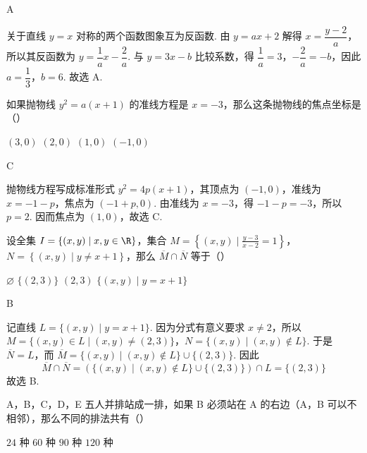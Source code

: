 \begin{answer}A\end{answer}

\begin{solution}
关于直线 \(y=x\) 对称的两个函数图象互为反函数. 由 \(y=ax+2\) 解得 \(x=\dfrac{y-2}{a}\)，所以其反函数为 \(y=\dfrac{1}{a}x-\dfrac{2}{a}\). 与 \(y=3x-b\) 比较系数，得 \(\dfrac1a=3\)，\(-\dfrac2a=-b\)，因此 \(a=\dfrac13\)，\(b=6\). 故选 A.
\end{solution}


\begin{problem}
如果抛物线 \(y^2=a(x+1)\) 的准线方程是 \(x=-3\)，那么这条抛物线的焦点坐标是（\quad）

\choices
    {\((3,0)\)}
    {\((2,0)\)}
    {\((1,0)\)}
    {\((-1,0)\)}
\end{problem}

\begin{answer}C\end{answer}

\begin{solution}
抛物线方程写成标准形式 \(y^2=4p(x+1)\)，其顶点为 \((-1,0)\)，准线为 \(x=-1-p\)，焦点为 \((-1+p,0)\). 由准线为 \(x=-3\)，得 \(-1-p=-3\)，所以 \(p=2\). 因而焦点为 \((1,0)\)，故选 C.
\end{solution}


\begin{problem}
设全集 \(I=\left\{(x,y)\mid x,y\in\R\right\}\)，集合 \(M=\left\{(x,y)\mid \frac{y-3}{x-2}=1\right\}\)，\(N=\left\{(x,y)\mid y\neq x+1\right\}\)，那么 \(\overline{M}\cap \overline{N}\) 等于（\quad）

\choices
    {\(\varnothing\)}
    {\(\{(2,3)\}\)}
    {\((2,3)\)}
    {\(\{(x,y)\mid y=x+1\}\)}
\end{problem}

\begin{answer}B\end{answer}

\begin{solution}
记直线 \(L=\{(x,y)\mid y=x+1\}\). 因为分式有意义要求 \(x\ne2\)，所以
\(M=\{(x,y)\in L\mid (x,y)\ne(2,3)\}\)，\(N=\{(x,y)\mid (x,y)\notin L\}\).
于是 \(\overline{N}=L\)，而 \(\overline{M}=\{(x,y)\mid (x,y)\notin L\}\cup\{(2,3)\}\). 因此
\[
\overline{M}\cap\overline{N}=\left(\{(x,y)\mid (x,y)\notin L\}\cup\{(2,3)\}\right)\cap L=\{(2,3)\}
\]
故选 B.
\end{solution}


\begin{problem}
A，B，C，D，E 五人并排站成一排，如果 B 必须站在 A 的右边（A，B 可以不相邻），那么不同的排法共有（\quad）

\choices
    {\(24\) 种}
    {\(60\) 种}
    {\(90\) 种}
    {\(120\) 种}
\end{problem}

